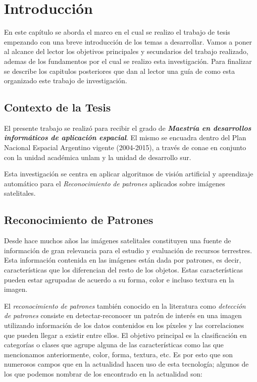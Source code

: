 \chapter{Introducción}\label{chap:introduccion}

En este capítulo se aborda el marco en el cual se realizo el trabajo de tesis empezando con una breve introducción de los temas a desarrollar. Vamos a poner al alcance del lector los objetivos principales y secundarios del trabajo realizado, ademas de los fundamentos por el cual se realizo esta investigación. Para finalizar se describe los capitulos posteriores que dan al lector una guía de como esta organizado este trabajo de investigación.


\section{Contexto de la Tesis}\label{sec:contexto}
El presente trabajo se realizó para recibir el grado de\textbf{ \textit{Maestría en desarrollos informáticos de aplicación espacial}}. El mismo se encuadra dentro del Plan Nacional Espacial Argentino vigente (2004-2015), a través de \ac{conae} en conjunto con la unidad académica \ac{unlam} y la unidad de desarrollo \ac{sur}.

Esta investigación se centra en aplicar  algoritmos de visión artificial y aprendizaje automático para el \textit{Reconocimiento de patrones} aplicados sobre imágenes satelitales.

\section{Reconocimiento de Patrones}\label{sec:introreconocimiento}
Desde hace muchos años las imágenes satelitales constituyen una fuente de información de gran relevancia para el estudio y evaluación de recursos terrestres. Esta  información contenida en las imágenes están dada por patrones, es decir, características que los diferencian del resto de los objetos. Estas características pueden estar agrupadas  de acuerdo a su forma, color e incluso textura en la imagen.

El \textit{reconocimiento de patrones} también conocido en la literatura como \textit{detección de patrones} consiste en detectar-reconocer un patrón de interés en una imagen utilizando información de los datos contenidos en los píxeles y las correlaciones que pueden llegar a existir entre ellos. El objetivo principal es la clasificación  en categorías o clases que agrupe alguna de las características como las que mencionamos anteriormente, color, forma, textura, etc. Es por esto que son numerosos campos que en la actualidad hacen uso de esta tecnología; algunos de los que podemos nombrar de los encontrado en la actualidad son:

